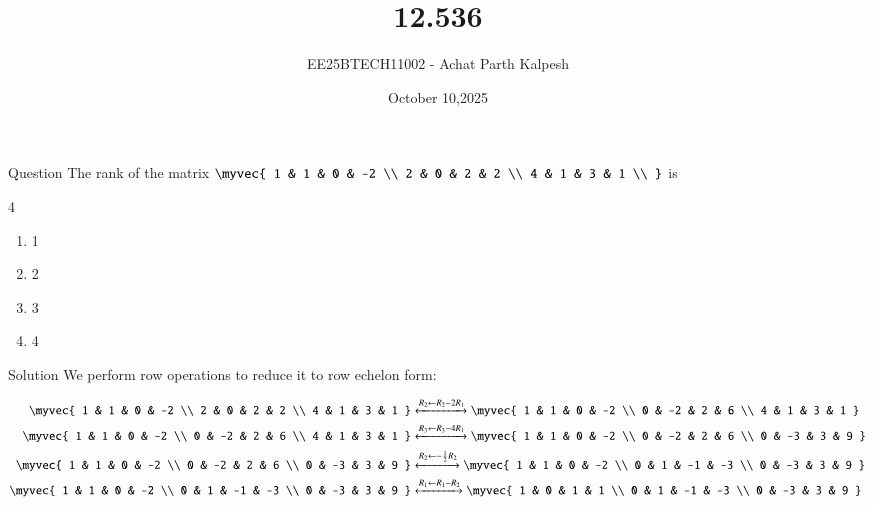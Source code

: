 \documentclass{beamer}
\title %
{12.536}
\date{October 10,2025}
\author %
{EE25BTECH11002 - Achat Parth Kalpesh}
\begin{document}
\frame{\titlepage}

\begin{frame}{Question}
The rank of the matrix 
$
\myvec{
1 & 1 & 0 & -2 \\
2 & 0 & 2 & 2 \\
4 & 1 & 3 & 1 \\
}$
is

\begin{multicols}{4}
\begin{enumerate}
    \item 1
    \item 2
    \item 3
    \item 4
\end{enumerate}
\end{multicols}
\end{frame}

\begin{frame}{Solution}
We perform row operations to reduce it to row echelon form:


\begin{align}
\myvec{
1 & 1 & 0 & -2 \\
2 & 0 & 2 & 2 \\
4 & 1 & 3 & 1
}
&\xleftrightarrow[]{R_2 \leftarrow R_2 - 2R_1}
\myvec{
1 & 1 & 0 & -2 \\
0 & -2 & 2 & 6 \\
4 & 1 & 3 & 1
} \\
\myvec{
1 & 1 & 0 & -2 \\
0 & -2 & 2 & 6 \\
4 & 1 & 3 & 1
}&\xleftrightarrow[]{R_3 \leftarrow R_3 - 4R_1}
\myvec{
1 & 1 & 0 & -2 \\
0 & -2 & 2 & 6 \\
0 & -3 & 3 & 9
} \\
\myvec{
1 & 1 & 0 & -2 \\
0 & -2 & 2 & 6 \\
0 & -3 & 3 & 9
}&\xleftrightarrow[]{R_2 \leftarrow -\frac{1}{2} R_2}
\myvec{
1 & 1 & 0 & -2 \\
0 & 1 & -1 & -3 \\
0 & -3 & 3 & 9
} \\
\myvec{
1 & 1 & 0 & -2 \\
0 & 1 & -1 & -3 \\
0 & -3 & 3 & 9
}&\xleftrightarrow[]{R_1 \leftarrow R_1 - R_2}
\myvec{
1 & 0 & 1 & 1 \\
0 & 1 & -1 & -3 \\
0 & -3 & 3 & 9
}
\end{align}
\end{frame}
\end{document}
